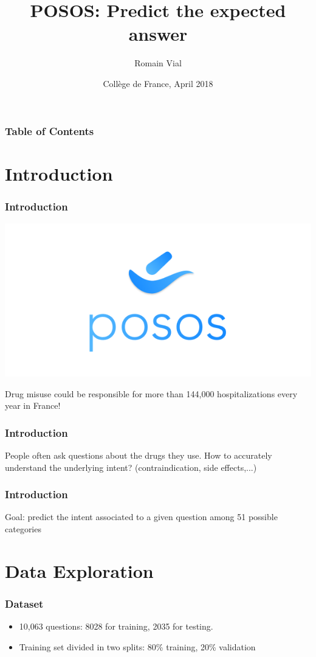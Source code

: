 \documentclass{beamer}
\title{POSOS: Predict the expected answer}
\author{Romain Vial}
\institute{romain.vial@mines-paristech.fr}
\date{Collège de France, April 2018}
\begin{document}
 
\frame{\titlepage}

\begin{frame}
\frametitle{Table of Contents}
\tableofcontents[subsubsectionstyle=hide, subsectionstyle=hide]
\end{frame}

\section{Introduction}

\begin{frame}
\frametitle{Introduction}

\centering
\includegraphics[width=.3\linewidth]{images/posos}

Drug misuse could be responsible for more than 144,000 hospitalizations every year in France!

\end{frame}

\begin{frame}
\frametitle{Introduction}
People often ask questions about the drugs they use. How to accurately understand the underlying intent? (contraindication, side effects,...)

\end{frame}

\begin{frame}
\frametitle{Introduction}
Goal: predict the intent associated to a given question among 51 possible categories

\end{frame}

\section{Data Exploration}

\begin{frame}
\frametitle{Dataset}

\begin{itemize}
\item 10,063 questions: 8028 for training, 2035 for testing. 
\item Training set divided in two splits: 80\% training, 20\% validation 
\end{itemize}

\end{frame}
\end{document}
